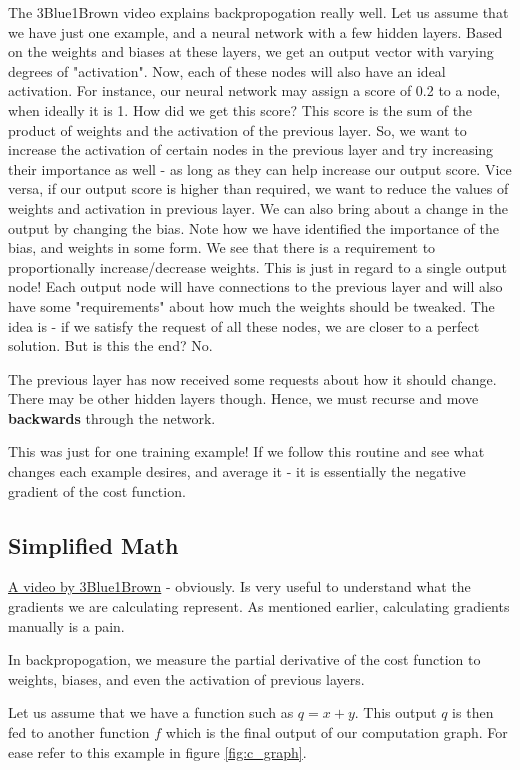 The 3Blue1Brown video explains backpropogation really well. Let us assume that we have just one example, and a neural network with a few hidden layers. Based on the weights and biases at these layers, we get an output vector with varying degrees of "activation". Now, each of these nodes will also have an ideal activation. For instance, our neural network may assign a score of 0.2 to a node, when ideally it is 1. How did we get this score? This score is the sum of the product of weights and the activation of the previous layer. So, we want to increase the activation of certain nodes in the previous layer and try increasing their importance as well - as long as they can help increase our output score. Vice versa, if our output score is higher than required, we want to reduce the values of weights and activation in previous layer. We can also bring about a change in the output by changing the bias. Note how we have identified the importance of the bias, and weights in some form. We see that there is a requirement to proportionally increase/decrease weights. This is just in regard to a single output node! Each output node will have connections to the previous layer and will also have some "requirements" about how much the weights should be tweaked. The idea is - if we satisfy the request of all these nodes, we are closer to a perfect solution. But is this the end? No.

The previous layer has now received some requests about how it should change. There may be other hidden layers though. Hence, we must recurse and move \textbf{backwards} through the network.

This was just for one training example! If we follow this routine and see what changes each example desires, and average it - it is essentially the negative gradient of the cost function.

\subsection{Simplified Math}

\href{https://www.youtube.com/watch?v=tIeHLnjs5U8}{A video by 3Blue1Brown} - obviously. Is very useful to understand what the gradients we are calculating represent. As mentioned earlier, calculating gradients manually is a pain.

In backpropogation, we measure the partial derivative of the cost function to weights, biases, and even the activation of previous layers.

Let us assume that we have a function such as $q = x + y$. This output $q$ is then fed to another function $f$ which is the final output of our computation graph. For ease refer to this example in figure \ref{fig:c_graph}.

